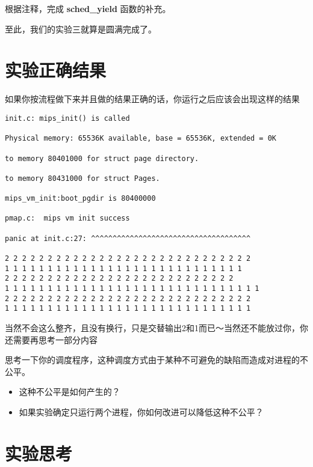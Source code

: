 \begin{exercise}
根据注释，完成 \textbf{sched\_yield }函数的补充。
\end{exercise}

至此，我们的实验三就算是圆满完成了。

\section{实验正确结果}
如果你按流程做下来并且做的结果正确的话，你运行之后应该会出现这样的结果

\begin{verbatim}
init.c: mips_init() is called

Physical memory: 65536K available, base = 65536K, extended = 0K

to memory 80401000 for struct page directory.

to memory 80431000 for struct Pages.

mips_vm_init:boot_pgdir is 80400000

pmap.c:  mips vm init success

panic at init.c:27: ^^^^^^^^^^^^^^^^^^^^^^^^^^^^^^^^^^^^^

2 2 2 2 2 2 2 2 2 2 2 2 2 2 2 2 2 2 2 2 2 2 2 2 2 2 2 2 2 
1 1 1 1 1 1 1 1 1 1 1 1 1 1 1 1 1 1 1 1 1 1 1 1 1 1 1 1   
2 2 2 2 2 2 2 2 2 2 2 2 2 2 2 2 2 2 2 2 2 2 2 2 2 2 2 
1 1 1 1 1 1 1 1 1 1 1 1 1 1 1 1 1 1 1 1 1 1 1 1 1 1 1 1 1 1 
2 2 2 2 2 2 2 2 2 2 2 2 2 2 2 2 2 2 2 2 2 2 2 2 2 2 2 2 2 
1 1 1 1 1 1 1 1 1 1 1 1 1 1 1 1 1 1 1 1 1 1 1 1 1 1 1 1 1 
\end{verbatim}

当然不会这么整齐，且没有换行，只是交替输出2和1而已～当然还不能放过你，你还需要再思考一部分内容

\begin{thinking}\label{think-调度}
思考一下你的调度程序，这种调度方式由于某种不可避免的缺陷而造成对进程的不公平。
  \begin{itemize}
    \item 这种不公平是如何产生的？
    \item 如果实验确定只运行两个进程，你如何改进可以降低这种不公平？
  \end{itemize}
\end{thinking}

\section{实验思考}

